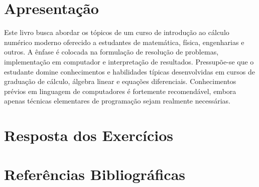\documentclass[12pt,a4paper]{book}
\begin{document}
\chapter*{Apresentação}
Este livro busca abordar os tópicos de um curso de introdução ao cálculo numérico moderno oferecido a estudantes de matemática, física, engenharias e outros. A ênfase é colocada na formulação de resolução de problemas, implementação em computador e interpretação de resultados. Pressupõe-se que o estudante domine conhecimentos e habilidades típicas desenvolvidas em cursos de graduação de cálculo, álgebra linear e equações diferenciais. Conhecimentos prévios em linguagem de computadores é fortemente recomendável, embora apenas técnicas elementares de programação sejam realmente necessárias.

\tableofcontents

\mainmatter










\ifisscilab
\appendix

\fi

\chapter*{Resposta dos Exercícios}
\shipoutAnswer  

\nocite{*}

\begingroup
\chapter*{Referências Bibliográficas}
\renewcommand{\chapter}[2]{}

\endgroup

\clearpage
{}
\printindex
\end{document}
